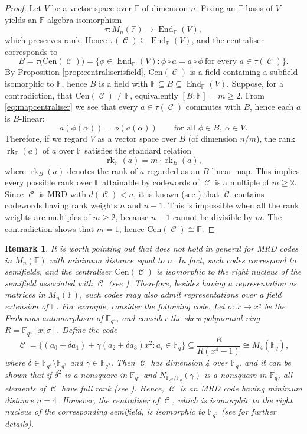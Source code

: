 \documentclass[a4paper, 11pt]{article}
\DeclareMathOperator{\C}{\mathcal{C}}
\DeclareMathOperator{\End}{End}
\DeclareMathOperator{\rk}{rk}
\newtheorem{remark}[theorem]{Remark}
\newcommand{\F}{{\mathbb F}}
\newcommand{\cen}{\mathrm{Cen}}
\begin{document}
\begin{proof}
 Let $V$ be a vector space over \(\F\) of dimension $n$. Fixing an $\F$-basis of $V$ yields an $\F$-algebra isomorphism
\[
\tau: M_n(\F)\longrightarrow\End_{\F}(V),
\]
which preserves rank. Hence $\tau(\C)\subseteq \End_{\F}(V)$, and the centraliser corresponds to
\begin{equation}\label{eq:mapcentraliser}
B = \tau\big(\cen(\C)\big)
        = \{\phi\in \End_{\F}(V) : \phi\circ a = a\circ \phi\ \text{for every } a\in \tau(\C)\}.
\end{equation}
By Proposition \ref{prop:centraliserisfield}, $\cen(\C)$ is a field containing a subfield isomorphic to $\F$, hence $B$ is a field with $\F\subseteq B\subseteq \End_{\F}(V)$. Suppose, for a contradiction, that $\cen(\C)\neq \F$, equivalently $[B:\F]=m\ge 2$. From \eqref{eq:mapcentraliser} we see that every $a\in \tau(\C)$ commutes with $B$, hence each $a$ is $B$-linear:
\[
a(\phi(\alpha))=\phi(a(\alpha))\qquad \text{for all } \phi\in B,\ \alpha\in V.
\]
Therefore, if we regard $V$ as a vector space over $B$ (of dimension $n/m$), the rank $\rk_{\F}(a)$ of $a$ over $\F$ satisfies the standard relation
\[
\rk_{\F}(a)= m\cdot \rk_{B}(a),
\]
where $\rk_{B}(a)$ denotes the rank of $a$ regarded as an $B$-linear map. This implies every possible rank over $\F$ attainable by codewords of $\C$ is a multiple of $m \geq 2$. Since $\C$ is MRD with $d(\C)<n$, it is known (see \cite[Lemma 2.1]{lunardon2018nuclei}) that $\C$ contains codewords having rank weights $n$ and $n-1$. This is impossible when all the rank weights are multiples of $m\ge 2$, because $n-1$ cannot be divisible by $m$. The contradiction shows that $m=1$, hence $\cen(\C)\cong \F$.
\end{proof}

\begin{remark}
It is worth pointing out that  does not hold in general for MRD codes in $M_n(\F)$ with minimum distance equal to $n$. In fact, such codes correspond to semifields, and the centraliser $\cen(\C)$ is isomorphic to the right nucleus of the semifield associated with $\C$ (see \cite[Proposition 5]{sheekey2020new}). Therefore, besides having a representation as matrices in $M_n(\F)$, such codes may also admit representations over a field extension of $\F$. For example, consider the following code. Let $\sigma: x \mapsto x^q$ be the Frobenius automorphism of $\F_{q^4}$, and consider the skew polynomial ring $R = \F_{q^4}[x; \sigma]$. Define the code
    \[
    \C = \{ (a_0 + \delta a_1) + \gamma (a_2 + \delta a_3)x^2 \colon a_i \in \F_q \} \subseteq \frac{R}{R(x^4-1)} \cong M_4(\F_q),
    \]
    where $\delta \in \F_{q^4} \setminus \F_{q^2}$ and $\gamma \in \F_{q^2}$. Then $\C$ has dimension 4 over $\F_q$, and it can be shown that if $\delta^2$ is a nonsquare in $\F_{q^2}$ and $N_{\F_{q^2}/\F_q}(\gamma)$ is a nonsquare in $\F_q$, all elements of $\C$ have full rank (see \cite[Theorem 4.6]{ebert2009infinite}). Hence, $\C$ is an MRD code having minimum distance $n=4$. However, the centraliser of $\C$, which is isomorphic to the right nucleus of the corresponding semifield, is isomorphic to $\F_{q^2}$ (see \cite{ebert2009infinite} for further details).
\end{remark}
\end{document}
